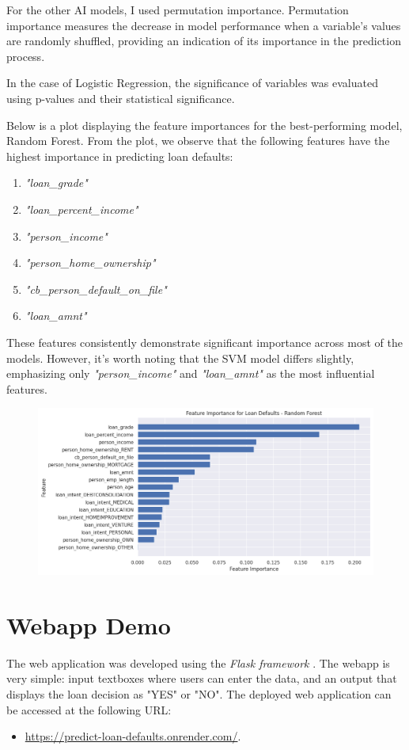 \documentclass{article}
\begin{document}
For the other AI models, I used permutation importance. Permutation importance measures the decrease in model performance when a variable's values are randomly shuffled, providing an indication of its importance in the prediction process.

In the case of Logistic Regression, the significance of variables was evaluated using p-values and their statistical significance.

\vspace{1.5em}\noindent 
Below is a plot displaying the feature importances for the best-performing model, Random Forest. From the plot, we observe that the following features have the highest importance in predicting loan defaults:
\begin{enumerate}    
\item \emph{"loan\_grade"}
\item \emph{"loan\_percent\_income"}
\item \emph{"person\_income"}
\item \emph{"person\_home\_ownership"}
\item \emph{"cb\_person\_default\_on\_file"}
\item \emph{"loan\_amnt"}
\end{enumerate}

These features consistently demonstrate significant importance across most of the models. However, it's worth noting that the SVM model differs slightly, emphasizing only \emph{"person\_income"} and \emph{"loan\_amnt"} as the most influential features.

\begin{figure}[h!]
    \centering
    \includegraphics[width=\textwidth]{importance_rf.png}    
    \label{fig:importance_rf}
\end{figure}

\section{Webapp Demo}\label{sec:webapp}
The web application was developed using the \emph{Flask framework} \cite{flask}. The webapp is very simple: input textboxes where users can enter the data, and an output that displays the loan decision as "YES" or "NO". The deployed web application can be accessed at the following URL: 
\begin{itemize}
    \item \url{https://predict-loan-defaults.onrender.com/}.
\end{itemize}
\end{document}
